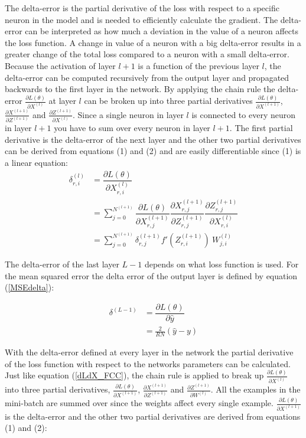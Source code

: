 \documentclass[a4paper, twoside]{article}
\newcommand*{\pd}[2]{\ensuremath{\dfrac{\partial #1}{\partial #2}}}
\newcommand*{\inpd}[2]{\ensuremath{\frac{\partial #1}{\partial #2}}}
\begin{document}
The delta-error is the partial derivative of the loss with respect to a specific neuron in the model and is needed to efficiently calculate the gradient. The delta-error can be interpreted as how much a deviation in the value of a neuron affects the loss function. A change in value of a neuron with a big delta-error results in a greater change of the total loss compared to a neuron with a small delta-error. Because the activation of layer $l+1$ is a function of the previous layer $l$, the delta-error can be computed recursively from the output layer and propagated backwards to the first layer in the network. By applying the chain rule the delta-error $\inpd{L(\theta)}{X^{(l)}}$  at layer $l$ can be broken up into three partial derivatives $\inpd{L(\theta)}{X^{(l+1)}}$, $\inpd{X^{(l+1)}}{Z^{(l+1)}}$ and $\inpd{Z^{(l+1)}}{X^{(l)}}$. Since a single neuron in layer $l$ is connected to every neuron in layer $l+1$ you have to sum over every neuron in layer $l+1$. The first partial derivative is the delta-error of the next layer and the other two partial derivatives can be derived from equations (1) and (2) and are easily differentiable since (1) is a linear equation: \cite{cs231n} \cite{wikiStanford}
\begin{equation}\label{dLdX_FCC}
\begin{split}
\delta^{(l)}_{r,i}
	& = \pd{L(\theta)}{X^{(l)}_{r,i}}  \\
	& = \sum^{N^{(l+1)}}_{j=0} \pd{L(\theta)}{X^{(l+1)}_{r,j}} \pd{X^{(l+1)}_{r,j}}{Z^{(l+1)}_{r,j}} \pd{Z^{(l+1)}_{r,j}}{X^{(l)}_{r,i}} \\
	& = \sum^{N^{(l+1)}}_{j=0} \delta^{(l+1)}_{r,j} f'(Z^{(l+1)}_{r,i}) \ W^{(l)}_{j,i} 
\end{split}
\end{equation}

The delta-error of the last layer $L-1$ depends on what loss function is used. For the mean squared error the delta error of the output layer is defined by equation (\ref{MSEdelta}): \cite{cs231n} \cite{wikiStanford}

\begin{equation}\label{MSEdelta}
\begin{split}
\delta^{(L-1)}
	& = \pd{L(\theta)}{\hat{y}}  \\
	& = \frac{2}{RN} (\hat{y}-y)
\end{split}
\end{equation}

With the delta-error defined at every layer in the network the partial derivative of the loss function with respect to the networks parameters can be calculated. Just like equation (\ref{dLdX_FCC}), the chain rule is applied to break up $\inpd{L(\theta)}{X^{(l)}}$ into three partial derivatives, $\inpd{L(\theta)}{X^{(l+1)}}$, $\inpd{X^{(l+1)}}{Z^{(l+1)}}$ and $\inpd{Z^{(l+1)}}{W^{(l)}}$. All the examples in the mini-batch are summed over since the weights affect every single example. $\inpd{L(\theta)}{X^{(l+1)}}$ is the delta-error and the other two partial derivatives are derived from equations (1) and (2): \cite{cs231n} \cite{wikiStanford}
\end{document}

